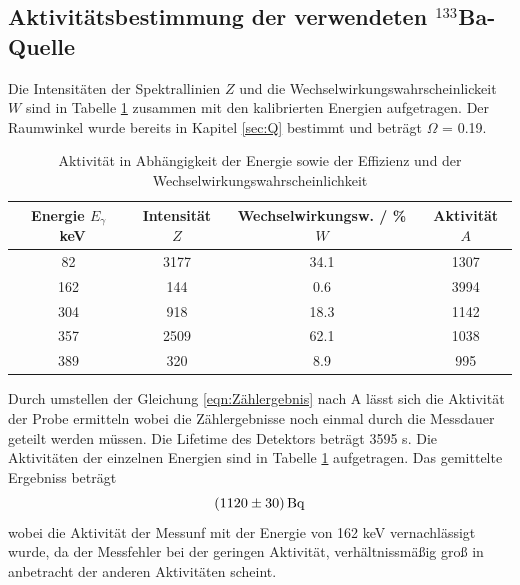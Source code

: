 \subsection{Aktivitätsbestimmung der verwendeten $^{133}$Ba-Quelle}
Die Intensitäten der Spektrallinien $Z$ und die Wechselwirkungswahrscheinlickeit $W$ sind in Tabelle \ref{tab:Ba} zusammen mit den kalibrierten Energien aufgetragen. Der Raumwinkel wurde bereits in Kapitel \ref{sec:Q} bestimmt und beträgt $\Omega$ = 0.19.
\begin{table}
  \centering
  \caption{Aktivität in Abhängigkeit der Energie sowie der Effizienz und der Wechselwirkungswahrscheinlichkeit}
  \begin{tabular}{c c c c}
    \toprule
	Energie $E_\gamma$ \ keV & Intensität $Z$ & Wechselwirkungsw. / \% $W$ & Aktivität $A$ \\
    \hline
	82	& 3177	& 34.1	& 1307	\\
	162	& 144	& 0.6	& 3994	\\
	304	& 918	& 18.3	& 1142	\\
	357	& 2509	& 62.1	& 1038	\\
	389	& 320	& 8.9	& 995	\\
    \bottomrule
  \end{tabular}
  \label{tab:Ba}
\end{table}
Durch umstellen der Gleichung \ref{eqn:Zählergebnis} nach A lässt sich die Aktivität der Probe ermitteln wobei die Zählergebnisse noch einmal durch die Messdauer geteilt werden müssen. Die Lifetime des Detektors beträgt 3595 s. Die Aktivitäten der einzelnen Energien sind in Tabelle \ref{tab:Ba} aufgetragen. Das gemittelte Ergebniss beträgt
\begin{equation}
  (\num{1120 +- 30}) \, \text{Bq}
  \label{eqn:aktBq}
\end{equation}
wobei die Aktivität der Messunf mit der Energie von 162 keV vernachlässigt wurde, da der Messfehler bei der geringen Aktivität, verhältnissmäßig groß in anbetracht der anderen Aktivitäten scheint.
